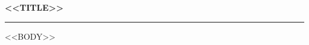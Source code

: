 \documentclass[10pt]{article}
\begin{document}
{\lnpsans\bfseries\large <<TITLE>>}\hfill{}\par\vspace{1pt}
{\color{lnpbar}\rule{\linewidth}{0.8pt}}\par\vspace{3pt}
<<BODY>>
\end{document}
